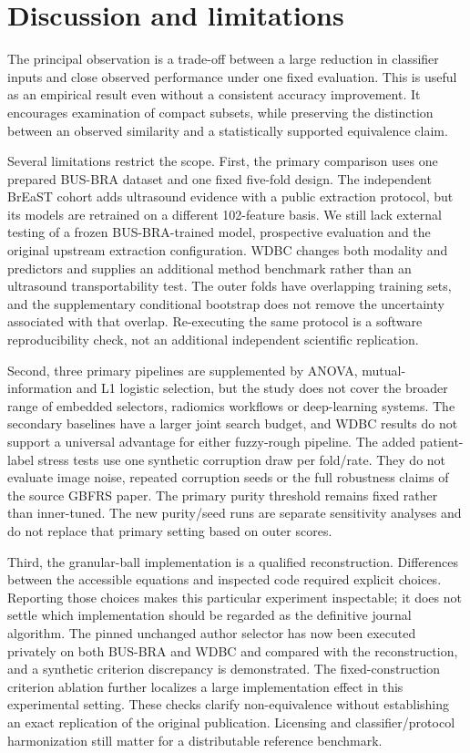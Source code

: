 \documentclass[11pt,a4paper]{article}
\begin{document}
\section{Discussion and limitations}
The principal observation is a trade-off between a large reduction in classifier inputs and close observed performance under one fixed evaluation. This is useful as an empirical result even without a consistent accuracy improvement. It encourages examination of compact subsets, while preserving the distinction between an observed similarity and a statistically supported equivalence claim.

Several limitations restrict the scope. First, the primary comparison uses one prepared BUS-BRA dataset and one fixed five-fold design. The independent BrEaST cohort adds ultrasound evidence with a public extraction protocol, but its models are retrained on a different 102-feature basis. We still lack external testing of a frozen BUS-BRA-trained model, prospective evaluation and the original upstream extraction configuration. WDBC changes both modality and predictors and supplies an additional method benchmark rather than an ultrasound transportability test. The outer folds have overlapping training sets, and the supplementary conditional bootstrap does not remove the uncertainty associated with that overlap. Re-executing the same protocol is a software reproducibility check, not an additional independent scientific replication.

Second, three primary pipelines are supplemented by ANOVA, mutual-information and L1 logistic selection, but the study does not cover the broader range of embedded selectors, radiomics workflows or deep-learning systems. The secondary baselines have a larger joint search budget, and WDBC results do not support a universal advantage for either fuzzy-rough pipeline. The added patient-label stress tests use one synthetic corruption draw per fold/rate. They do not evaluate image noise, repeated corruption seeds or the full robustness claims of the source GBFRS paper. The primary purity threshold remains fixed rather than inner-tuned. The new purity/seed runs are separate sensitivity analyses and do not replace that primary setting based on outer scores.

Third, the granular-ball implementation is a qualified reconstruction. Differences between the accessible equations and inspected code required explicit choices. Reporting those choices makes this particular experiment inspectable; it does not settle which implementation should be regarded as the definitive journal algorithm. The pinned unchanged author selector has now been executed privately on both BUS-BRA and WDBC and compared with the reconstruction, and a synthetic criterion discrepancy is demonstrated. The fixed-construction criterion ablation further localizes a large implementation effect in this experimental setting. These checks clarify non-equivalence without establishing an exact replication of the original publication. Licensing and classifier/protocol harmonization still matter for a distributable reference benchmark.
\end{document}
